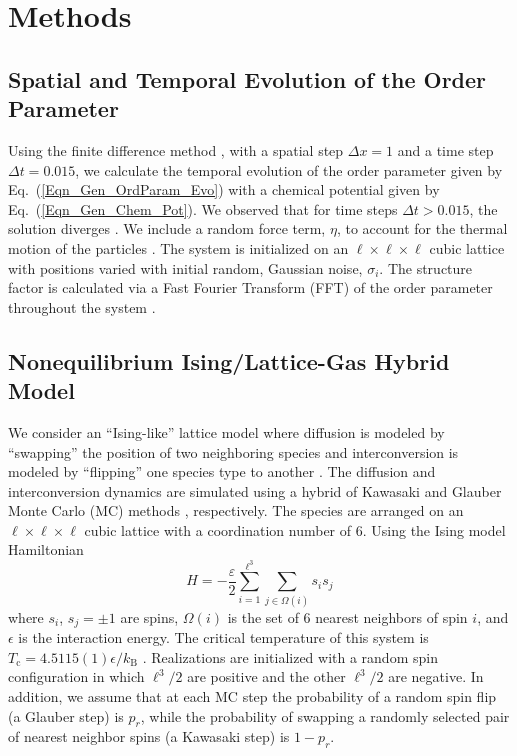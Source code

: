 \documentclass[5p,twocolumn]{elsarticle}
\begin{document}
\section{Methods}
\subsection{Spatial and Temporal Evolution of the Order Parameter}
Using the finite difference method \cite{Press_Numerical_2007}, with a spatial step $\Delta x = 1$ and a time step $\Delta t = 0.015$, we calculate the temporal evolution of the order parameter given by Eq.~(\ref{Eqn_Gen_OrdParam_Evo}) with a chemical potential given by Eq.~(\ref{Eqn_Gen_Chem_Pot}). We observed that for time steps $\Delta t > 0.015$, the solution diverges \cite{Press_Numerical_2007}. We include a random force term, $\eta$, to account for the thermal motion of the particles  \cite{cook_brownian_1970,binder_collective_1983}. The system is initialized on an $\ell\times\ell\times\ell$ cubic lattice with positions varied with initial random, Gaussian noise, $\sigma_i$. The structure factor is calculated via a Fast Fourier Transform (FFT) of the order parameter throughout the system \cite{Press_Numerical_2007}.

\subsection{Nonequilibrium Ising/Lattice-Gas Hybrid Model}
We consider an ``Ising-like'' lattice model where diffusion is modeled by ``swapping'' the position of two neighboring species and interconversion is modeled by ``flipping'' one species type to another \cite{Shum_Phase_2021}. The diffusion and interconversion dynamics are simulated using a hybrid of Kawasaki and Glauber Monte Carlo (MC) methods \cite{Bray_Theory_2002,kawasaki_diffusion_1966,glauber_timedependent_1963}, respectively. The species are arranged on an $\ell\times\ell\times\ell$ cubic lattice with a coordination number of 6. Using the Ising model Hamiltonian \cite{Huang_Stat_1987}
\begin{equation}
    H = -\frac{\varepsilon}{2}\sum_{i=1}^{\ell^3} \sum_{j\in \Omega(i)} s_i s_j
\end{equation}
where $s_i$, $s_j=\pm 1$ are spins, $\Omega(i)$ is the set of 6 nearest neighbors of spin $i$, and $\epsilon$ is the interaction energy. The critical temperature of this system is $T_\text{c} = 4.5115(1)\epsilon/k_\text{B}$ \cite{Heuer_Critical_1993}. Realizations are initialized with a random spin configuration in which $\ell^3/2$ are positive and the other $\ell^3/2$ are negative. In addition, we assume that at each MC step the probability of a random spin flip (a Glauber step) is $p_r$, while the probability of swapping a randomly selected pair of nearest neighbor spins (a Kawasaki step) is $1-p_r$. 
\end{document}
